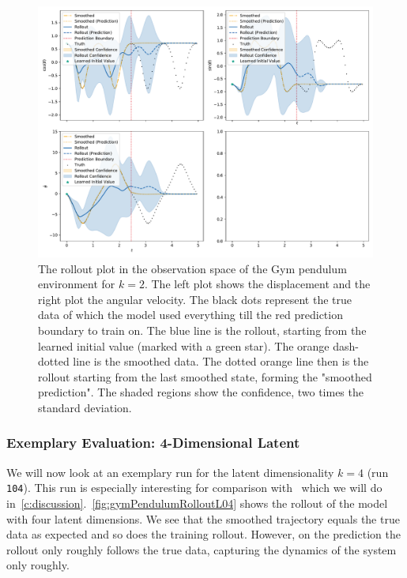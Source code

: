 			\begin{figure}
				\centering
				\includegraphics[width=\linewidth]{figures/results/pendulum-gym/run-latent-dim-02/rollout-observations-N0.pdf}
				\caption{The rollout plot in the observation space of the Gym pendulum environment for \(k = 2\). The left plot shows the displacement and the right plot the angular velocity. The black dots represent the true data of which the model used everything till the red prediction boundary to train on. The blue line is the rollout, starting from the learned initial value (marked with a green star). The orange dash-dotted line is the smoothed data. The dotted orange line then is the rollout starting from the last smoothed state, forming the "smoothed prediction". The shaded regions show the confidence, \ie two times the standard deviation.}
				\label{fig:gymPendulumRolloutL02}
			\end{figure}

		\subsubsection{Exemplary Evaluation: 4-Dimensional Latent}
			\label{subsubsec:gymPendulumL04}

			We will now look at an exemplary run for the latent dimensionality \( k = 4 \) (run \texttt{104}). This run is especially interesting for comparison with~\cite{mortonDeepVariationalKoopman2019a} which we will do in~\autoref{c:discussion}.~\autoref{fig:gymPendulumRolloutL04} shows the rollout of the model with four latent dimensions. We see that the smoothed trajectory equals the true data as expected and so does the training rollout. However, on the prediction the rollout only roughly follows the true data, capturing the dynamics of the system only roughly.

